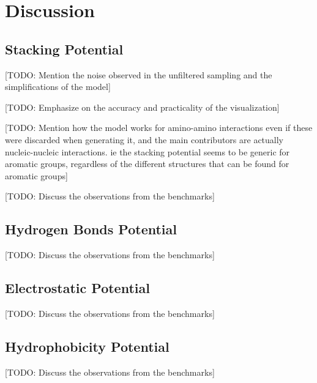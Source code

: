 \chapter{Discussion} %

\section{Stacking Potential}
  [TODO: Mention the noise observed in the unfiltered sampling and the simplifications of the model]

  [TODO: Emphasize on the accuracy and practicality of the visualization]

  [TODO: Mention how the model works for amino-amino interactions even if these were discarded when generating it, and the main contributors are actually nucleic-nucleic interactions. ie the stacking potential seems to be generic for aromatic groups, regardless of the different structures that can be found for aromatic groups]

  [TODO: Discuss the observations from the benchmarks]


\section{Hydrogen Bonds Potential}
  [TODO: Discuss the observations from the benchmarks]


\section{Electrostatic Potential}
  [TODO: Discuss the observations from the benchmarks]


\section{Hydrophobicity Potential}
  [TODO: Discuss the observations from the benchmarks]


